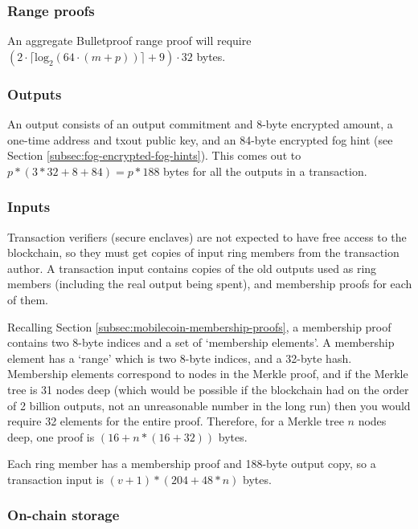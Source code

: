 \subsubsection*{Range proofs}

An aggregate Bulletproof range proof will require $(2 \cdot \lceil \textrm{log}_2(64 \cdot (m+ p)) \rceil + 9) \cdot 32$ bytes.

\subsubsection*{Outputs}

An output consists of an output commitment and 8-byte encrypted amount, a one-time address and txout public key, and an 84-byte encrypted fog hint (see Section \ref{subsec:fog-encrypted-fog-hints}). This comes out to $p*(3*32 + 8 + 84) = p*188$ bytes for all the outputs in a transaction.

\subsubsection*{Inputs}

Transaction verifiers (secure enclaves) are not expected to have free access to the blockchain, so they must get copies of input ring members from the transaction author. A transaction input contains copies of the old outputs used as ring members (including the real output being spent), and membership proofs for each of them.

Recalling Section \ref{subsec:mobilecoin-membership-proofs}, a membership proof contains two 8-byte indices and a set of `membership elements'. A membership element has a `range' which is two 8-byte indices, and a 32-byte hash. Membership elements correspond to nodes in the Merkle proof, and if the Merkle tree is 31 nodes deep (which would be possible if the blockchain had on the order of 2 billion outputs, not an unreasonable number in the long run) then you would require 32 elements for the entire proof. Therefore, for a Merkle tree $n$ nodes deep, one proof is $(16 + n*(16 + 32))$ bytes.%

Each ring member has a membership proof and 188-byte output copy, so a transaction input is $(v + 1)*(204 + 48*n)$ bytes.

\subsubsection*{On-chain storage}


